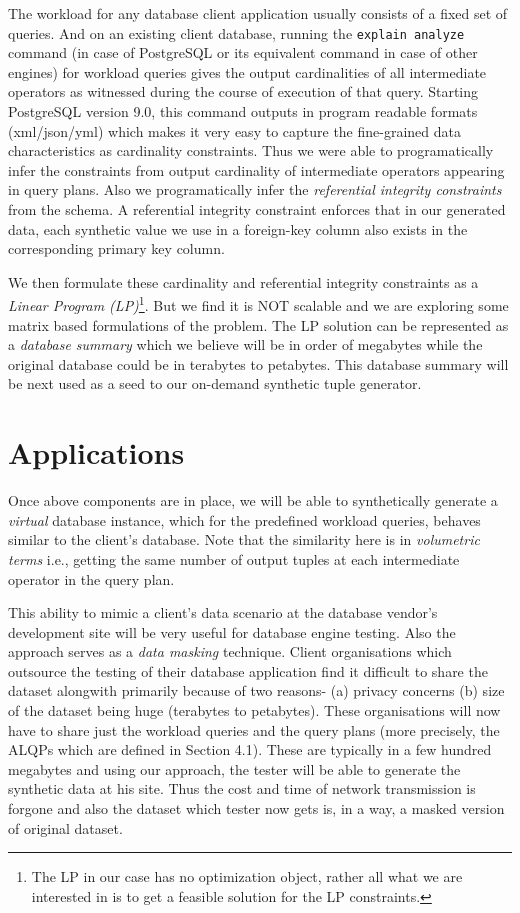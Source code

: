 \documentclass[]{article}
\begin{document}
\begin{multicols}{2}
		The workload for any database client application usually consists of a fixed set of queries. 
		And on an existing client database, running the \texttt{explain analyze} \cite{ea} command (in case of PostgreSQL or its equivalent command in case of other engines) for workload queries gives the output cardinalities of all intermediate operators as witnessed during the course of execution of that query. 
		Starting PostgreSQL version 9.0, this command outputs in program readable formats (xml/json/yml) which makes it very easy to capture the fine-grained data characteristics as cardinality constraints. 
		Thus we were able to programatically infer the constraints from output cardinality of intermediate operators appearing in query plans.
		Also we programatically infer the \textit{referential integrity constraints} from the schema. 
		A referential integrity constraint enforces that in our generated data, each synthetic value we use in a foreign-key column also exists in the corresponding primary key column. 

		We then formulate these cardinality and referential integrity constraints as a \textit{Linear Program (LP)}\footnote{The LP in our case has no optimization object, rather all what we are interested in is to get a feasible solution for the LP constraints. }.
		But we find it is NOT scalable and we are exploring some matrix based formulations of the problem. 
		The LP solution can be represented as a \textit{database summary} which we believe will be in order of megabytes while the original database could be in terabytes to petabytes.
		This database summary will be next used as a seed to our on-demand synthetic tuple generator. 
		
	\section{Applications}
		Once above components are in place, we will be able to synthetically generate a \textit{virtual} database instance, which for the predefined workload queries, behaves similar to the client's database.
		Note that the similarity here is in \textit{volumetric terms} i.e., getting the same number of output tuples at each intermediate operator in the query plan. 
                
		This ability to mimic a client's data scenario at the database vendor's development site will be very useful for database engine testing.
		Also the approach serves as a \textit{data masking} technique. 
		Client organisations which outsource the testing of their database application find it difficult to share the dataset alongwith primarily because of two reasons- 
		(a) privacy concerns 
		(b) size of the dataset being huge (terabytes to petabytes). 
		These organisations will now have to share just the workload queries and the query plans (more precisely, the ALQPs which are defined in Section 4.1). 
		These are typically in a few hundred megabytes and using our approach, the tester will be able to generate the synthetic data at his site. 
		Thus the cost and time of network transmission is forgone and also the dataset which tester now gets is, in a way, a masked version of original dataset. 
		

\end{multicols}
\end{document}
